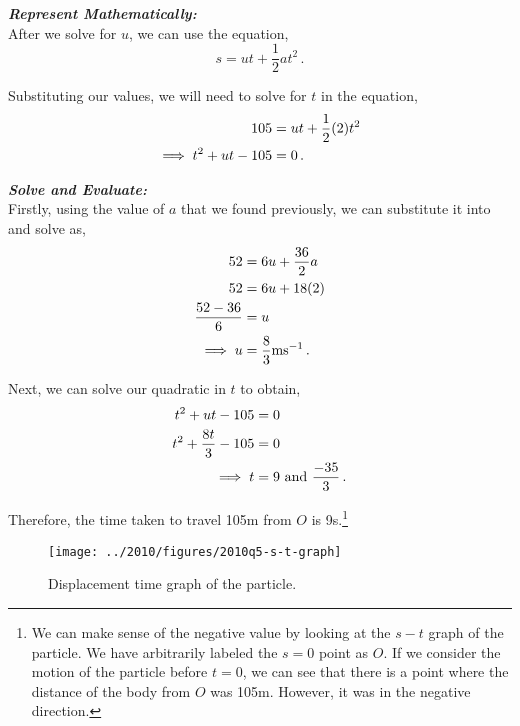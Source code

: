 \begin{subquestions}
\begin{subsubquestions}
\textbf{\textit{Represent Mathematically:}} \\
After we solve for $u$, we can use the equation,
\begin{equation}
	s=ut+\frac{1}{2}at^2 \,.
\end{equation}

Substituting our values, we will need to solve for $t$ in the equation,
\begin{align}
	105 & = ut+\frac{1}{2}(2)t^2 \nonumber \\
		\implies t^2 +ut -105 & = 0 \,.
\end{align}




\textbf{\textit{Solve and Evaluate:}} \\
Firstly, using the value of $a$ that we found previously, we can substitute it into  and solve as,
\begin{align}
	52 & = 6u + \frac{36}{2}a \nonumber \\
	52 & = 6u + 18(2) \nonumber \\ 
	\frac{52-36}{6} & = u \nonumber \\
	\implies u & = \frac{8}{3}\text{ms}^{-1} \,.
\end{align}

Next, we can solve our quadratic in $t$ to obtain,
\begin{align}
	t^2 +ut -105 & = 0 \nonumber \\
	t^2 +\frac{8t}{3} -105 & = 0 \nonumber \\
	\implies t & = 9 ~\text{and}~\frac{-35}{3} \,.
\end{align}

Therefore, the time taken to travel 105m from $O$ is 9s.\footnote{We can make sense of the negative value by looking at the $s-t$ graph of the particle. We have arbitrarily labeled the $s=0$ point as $O$. If we consider the motion of the particle before $t=0$, we can see that there is a point where the distance of the body from $O$ was 105m. However, it was in the negative direction.}
\begin{figure}[H]
	\begin{center}
		\texttt{[image: ../2010/figures/2010q5-s-t-graph]}
		\caption{\label{2010:q5:stGraph} Displacement time graph of the particle.}
	\end{center}
\end{figure}



\end{subsubquestions}
	

\end{subquestions}
